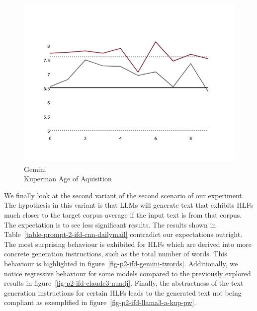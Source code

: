 \documentclass[11pt]{article}
\begin{document}
\begin{figure}[hpb]
\begin{minipage}{0.32\textwidth}
        \label{fig-p2-command-r-simpttr}
    \end{minipage}
    \hfill
    \begin{minipage}{0.32\textwidth}
        \includegraphics[width=\linewidth]{plots/prompt_2/prompt_2-gemini-cnn_dailymail/prompt_2-gemini-cnn_dailymail_a_kup_pw.png}
        \caption[center]{Gemini\\Kuperman Age of Aquisition}
        \label{fig-p2-gemini-a-kup-pw}
    \end{minipage}
\end{figure}

We finally look at the second variant of the second scenario of our experiment.
The hypothesis in this variant is that LLMs will generate text that exhibits
HLFs much closer to the target corpus average if the input text is from that
corpus.
The expectation is to see less significant results.
The results shown in Table~\ref{table-prompt-2-ifd-cnn-dailymail} contradict our
expectations outright.
The most surprising behaviour is exhibited for HLFs which are derived into more
concrete generation instructions, such as the total number of words.
This behaviour is highlighted in figure~\ref{fig-p2-ifd-gemini-twords}.
Additionally, we notice regressive behaviour for some models compared to the
previously explored results in figure~\ref{fig-p2-ifd-claude3-nuadj}.
Finally, the abstractness of the text generation instructions for certain HLFs
leads to the generated text not being compliant as exemplified in
figure~\ref{fig-p2-ifd-llama3-a-kup-pw}.
\end{document}
